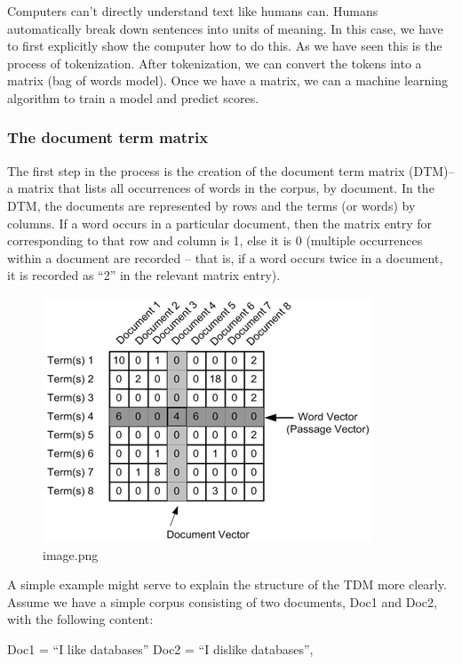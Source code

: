 \documentclass[11pt]{article}
\begin{document}
    Computers can't directly understand text like humans can. Humans
automatically break down sentences into units of meaning. In this case,
we have to first explicitly show the computer how to do this. As we have
seen this is the process of tokenization. After tokenization, we can
convert the tokens into a matrix (bag of words model). Once we have a
matrix, we can a machine learning algorithm to train a model and predict
scores.

    \hypertarget{the-document-term-matrix}{%
\subsubsection{The document term
matrix}\label{the-document-term-matrix}}

    The first step in the process is the creation of the document term
matrix (DTM)-- a matrix that lists all occurrences of words in the
corpus, by document. In the DTM, the documents are represented by rows
and the terms (or words) by columns. If a word occurs in a particular
document, then the matrix entry for corresponding to that row and column
is 1, else it is 0 (multiple occurrences within a document are recorded
-- that is, if a word occurs twice in a document, it is recorded as
``2'' in the relevant matrix entry).

    \begin{figure}
\centering
\includegraphics{./img/tf-idf-0.png}
\caption{image.png}
\end{figure}

    A simple example might serve to explain the structure of the TDM more
clearly. Assume we have a simple corpus consisting of two documents,
Doc1 and Doc2, with the following content:

Doc1 = ``I like databases'' Doc2 = ``I dislike databases'',
\end{document}
